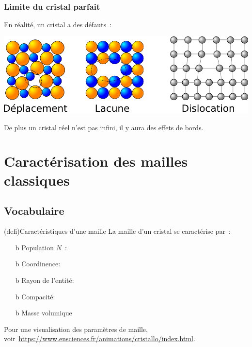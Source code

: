 \documentclass[../../main/main.tex]{subfiles}
\begin{document}
\subsubsection{Limite du cristal parfait}
En réalité, un cristal a des défauts~:
\begin{center}
	\includegraphics[scale=1]{crist_defaut}
\end{center}
De plus un cristal réel n'est pas infini, il y aura des effets de bords.

\section{Caractérisation des mailles classiques}
\subsection{Vocabulaire}
\begin{tcb}(defi){Caractéristiques d'une maille}
	La maille d'un cristal se caractérise par~:
	\begin{itemize}
		\item[b]{Population} $N$~: 
		\item[b]{Coordinence}: 
		\item[b]{Rayon de l'entité}: 
		\item[b]{Compacité}: 
		\item[b]{Masse volumique}
	\end{itemize}
\end{tcb}

Pour une visualisation des paramètres de maille,
voir~\url{https://www.ensciences.fr/animations/cristallo/index.html}.
\end{document}
